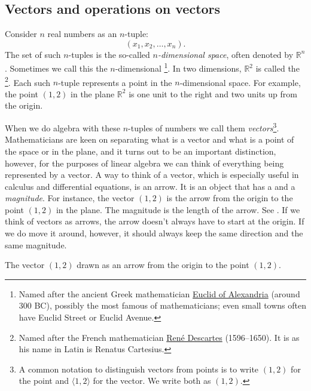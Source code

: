 \subsection{Vectors and operations on vectors}

Consider $n$ real numbers as an $n$-tuple:
\begin{equation*}
(x_1,x_2,\ldots,x_n). 
\end{equation*}
The set of such $n$-tuples is the so-called
\emph{$n$-dimensional space},
often denoted by ${\mathbb R}^n$.
Sometimes we call this the $n$-dimensional
\emph{}%
\footnote{Named after the ancient Greek mathematician
\href{https://en.wikipedia.org/wiki/Euclid}{Euclid of Alexandria}
(around 300 BC), possibly the most famous of mathematicians; even
small towns often have Euclid Street or Euclid Avenue.}. 
In two dimensions, ${\mathbb R}^2$ is called the
\emph{}%
\footnote{Named after the French mathematician
\href{https://en.wikipedia.org/wiki/Descartes}{Ren\'e Descartes}
(1596--1650).  It is  as his name in Latin is Renatus
Cartesius.}.
Each such $n$-tuple represents a point in the $n$-dimensional space.
For example, the point
$(1,2)$ in the plane ${\mathbb R}^2$
is one unit to the right and two units up from the
origin.

When we do algebra with these $n$-tuples of numbers we call them
\emph{vectors}\footnote{%
A common notation to distinguish vectors from points is to write $(1,2)$
for the point and $\langle 1,2 \rangle$ for the vector.  We write both as
$(1,2)$.}.  Mathematicians are keen on separating
what is a vector and what is a point of the space or in the plane,
and it turns out
to be an important distinction, however, for the purposes of linear algebra
we can think of everything being represented by a vector.
A way to think of a vector, which is especially useful in calculus
and differential equations, is an arrow.  It is an object that has
a \emph{} and a \emph{magnitude}.
For instance, the vector $(1,2)$
is the arrow from the origin to the point $(1,2)$ in the plane.
The magnitude is the length of the arrow.
See .
If we think of vectors as arrows,
the arrow doesn't always have to start at the origin.  If we do move it
around, however, it should always keep the same direction and the same magnitude.

\begin{myfig}
\capstart
{}
\caption{The vector $(1,2)$ drawn as an arrow from the origin to the point
$(1,2)$.\label{linalg-vecarrow:fig}}
\end{myfig}

